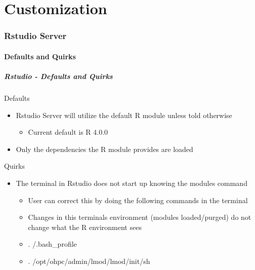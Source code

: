 \part{Customization}
\begin{frame}
			 \partpage
\end{frame}


\section[Rstudio]{Rstudio Server}
\subsection[rstudiodef]{Defaults and Quirks}
\begin{frame}
  \frametitle{Rstudio - Defaults and Quirks}
	\begin{block}{Defaults}
		\begin{itemize}
			\item Rstudio Server will utilize the default R module unless told otherwise
				\begin{itemize}
					\item Current default is R 4.0.0
				\end{itemize}
			\item Only the dependencies the R module provides are loaded
		\end{itemize}
	\end{block}
	\begin{block}{Quirks}
			\begin{itemize}
			\item The terminal in Rstudio does not start up knowing the modules command
			\begin{itemize}
			\item User can correct this by doing the following commands in the terminal
			\item Changes in this terminals environment (modules loaded/purged) do not change what the R environment sees
			\item . \ctilde{}/.bash\_profile
			\item . /opt/ohpc/admin/lmod/lmod/init/sh
			\end{itemize}
		\end{itemize}
	\end{block}
\end{frame}


